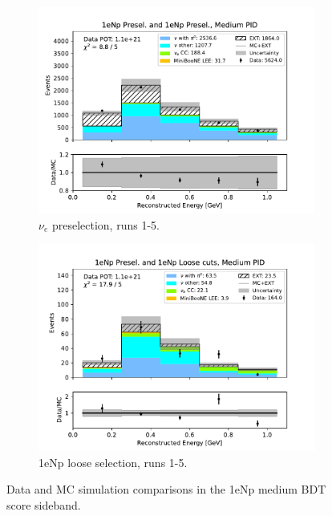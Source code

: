 \begin{figure}[H]
\begin{subfigure}{0.5\linewidth}
        \includegraphics[width=\linewidth]{technote/Sidebands/Figures/NearSideband/near_sideband_reco_e_run1234b4c4d5_NP_NP_MEDIUM_PID.pdf}
        \caption{$\nu_e$ preselection, runs 1-5.}
    \end{subfigure}%
    \begin{subfigure}{0.5\linewidth}
        \includegraphics[width=\linewidth]{technote/Sidebands/Figures/NearSideband/near_sideband_reco_e_run1234b4c4d5_NP_NPL_MEDIUM_PID.pdf}
        \caption{1eNp loose selection, runs 1-5.}
    \end{subfigure}
    \caption{Data and MC simulation comparisons in the 1eNp medium BDT score sideband.}
\end{figure}

